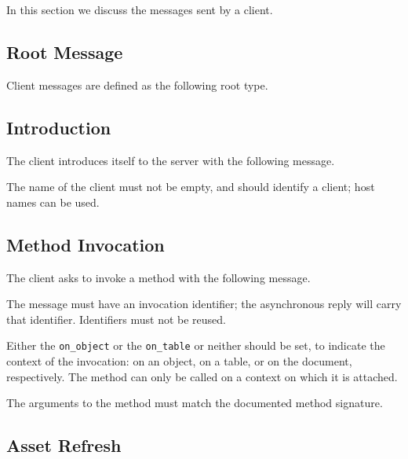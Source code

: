 \documentclass[11pt, oneside]{amsart}
\begin{document}
In this section we discuss the messages sent by a client.

\subsection{Root Message}

Client messages are defined as the following root type.



\subsection{Introduction}

The client introduces itself to the server with the following message.



The name of the client must not be empty, and should identify a client; host names can be used.

\subsection{Method Invocation}
\label{sec:method_invoke}

The client asks to invoke a method with the following message.



The message must have an invocation identifier; the asynchronous reply will carry that identifier. Identifiers must not be reused.

Either the \texttt{on\_object} or the \texttt{on\_table} or neither should be set, to indicate the context of the invocation: on an object, on a table, or on the document, respectively. The method can only be called on a context on which it is attached.

The arguments to the method must match the documented method signature.

\subsection{Asset Refresh} 
\label{sec:refresh_message}
\end{document}
